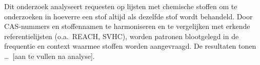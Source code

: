 Dit onderzoek analyseert requesten op lijsten met chemische stoffen om te
onderzoeken in hoeverre een stof altijd als dezelfde stof wordt behandeld.
Door CAS-nummers en stoffennamen te harmoniseren en te vergelijken met
erkende referentielijsten (o.a.\ REACH, SVHC), worden patronen blootgelegd
in de frequentie en context waarmee stoffen worden aangevraagd.
De resultaten tonen \ldots\ [aan te vullen na analyse].
